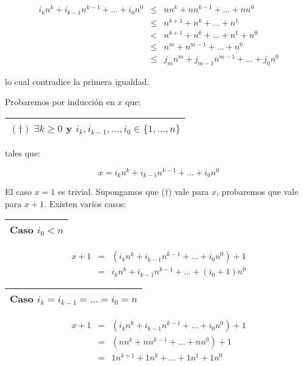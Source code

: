     \begin{eqnarray}
    	\nonumber i_{k} n^{k} + i_{k-1} n^{k-1} + ... + i_{0} n^{0} &\leq& n n^{k} + n n^{k-1} + ... + n n^{0} \\
    	\nonumber &\leq& n^{k+1} + n^{k} + ... + n^{1} \\
      \nonumber &<& n^{k+1} + n^{k}+ ... + n^{1} + n^{0} \\
      \nonumber &\leq& n^{m} + n^{m-1} + ... + n^{0} \\
      \nonumber &\leq& j_{m}n ^{m} + j_{m-1} n^{m-1} + ... + j_{0} n^{0}
		\end{eqnarray}

    \par lo cual contradice la primera igualdad.

    \par Probaremos por inducción en $x$ que: \begin{tabular}{|c|} \hline $ (\dag) \; \exists k \geq 0$ y $i_{k},
    i_{k-1}, ..., i_{0} \in \{1, ..., n\}$\\\hline\end{tabular} tales que:

    \[
      x = i_{k} n^{k} + i_{k-1} n^{k-1} + ... + i_{0} n^{0}
    \]

    El caso $x = 1$ es trivial. Supongamos que ($\dag$) vale para $x$, probaremos que vale para $x + 1$. Existen varios
    casos:

    \vspace{3mm}
    \begin{tabular}{|c|}
      \hline Caso $i_{0} < n$\\\hline
    \end{tabular}

    \begin{eqnarray}
      \nonumber x + 1 &=& \left(i_{k} n^{k} + i_{k-1} n^{k-1} + ... + i_{0} n^{0}\right) + 1 \\
      \nonumber &=& i_{k} n^{k} + i_{k-1} n^{k-1} + ... + (i_{0} + 1) n^{0}
    \end{eqnarray}

    \begin{tabular}{|c|}
      \hline Caso $i_{k}=i_{k-1}=...=i_{0}=n$\\\hline
    \end{tabular}

    \begin{eqnarray}
      \nonumber x + 1 &=& \left(i_{k} n^{k} + i_{k-1} n^{k-1} + ... + i_{0}n^{0}\right) + 1 \\
      \nonumber &=& \left(n n^{k} + n n^{k-1} + ... + n n^{0}\right) + 1 \\
      \nonumber &=& 1 n^{k+1} + 1 n^{k} + ... + 1 n^{1} + 1 n^{0}
    \end{eqnarray}

